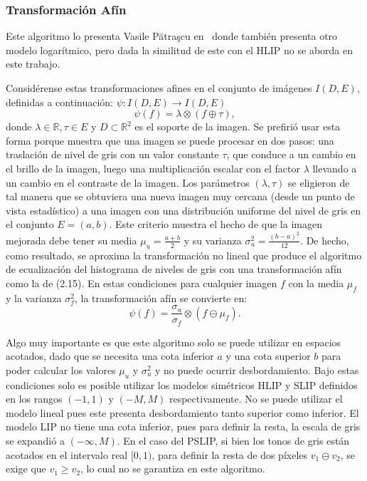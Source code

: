 \subsubsection{Transformaci\'on Af\'in}

Este algoritmo lo presenta Vasile Pătraşcu en~\cite{patrascu2003gray} donde tambi\'en presenta otro modelo logar\'itmico, pero dada la similitud de este con el HLIP no se aborda en este trabajo.

Consid\'erense estas transformaciones afines en el conjunto de imágenes $I (D, E)$, definidas a continuaci\'on: $\psi : I (D, E) \to I (D, E )$
\begin{equation}
	\psi(f)=\lambda\otimes(f\oplus\tau),
\end{equation}
donde $\lambda \in \mathbb{R}, \tau \in E$ y $D\subset\mathbb{R}^2$ es el soporte de la imagen. Se prefirió usar esta forma porque muestra que una imagen se puede procesar en dos pasos: una traslación de nivel de gris con un valor constante $\tau$, que conduce a un cambio en el brillo de la imagen, luego una multiplicación escalar con el factor $\lambda$  llevando a un cambio en el contraste de la imagen. Los parámetros $(\lambda, \tau )$ se eligieron de tal manera que se obtuviera una nueva imagen muy cercana (desde un punto de vista estadístico) a una imagen con una distribución uniforme del nivel de gris en el conjunto $E=(a,b)$. Este criterio muestra el hecho de que la imagen mejorada debe tener su media $\mu_u = \frac{a+b}{2}$ y su varianza $\sigma_u^2 = \frac{(b-a)^2}{12}$. De hecho, como resultado, se aproxima la transformaci\'on no lineal que produce el algoritmo de ecualización del histograma de niveles de gris con una transformaci\'on afín como la de (2.15). En estas condiciones para cualquier imagen $f$ con la media $\mu_f$ y la varianza $\sigma_f^2 $, la transformaci\'on afín  se convierte en:
\begin{equation}
	\psi(f)=\frac{\sigma_u}{\sigma_f}\otimes(f\ominus\mu_f).
\end{equation}

Algo muy importante es que este algoritmo solo se puede utilizar en espacios acotados, dado que se necesita una cota inferior $a$ y una cota superior $b$ para poder calcular los valores $\mu_u$ y $\sigma_u^2$ y no puede ocurrir desbordamiento. Bajo estas condiciones solo es posible utilizar los modelos sim\'etricos HLIP y SLIP definidos en los rangos $(-1,1)$ y $(- M, M)$ respectivamente. No se puede utilizar el modelo lineal pues este presenta desbordamiento tanto superior como inferior. El modelo LIP no tiene una cota inferior, pues para definir la resta, la escala de gris se expandi\'o a $(-\infty,M)$. En el caso del PSLIP, si bien los tonos de gris est\'an acotados en el intervalo real $[0,1)$, para definir la resta de dos p\'ixeles $v_1\ominus v_2$, se exige que $v_1\geq v_2$, lo cual no se garantiza en este algoritmo.

